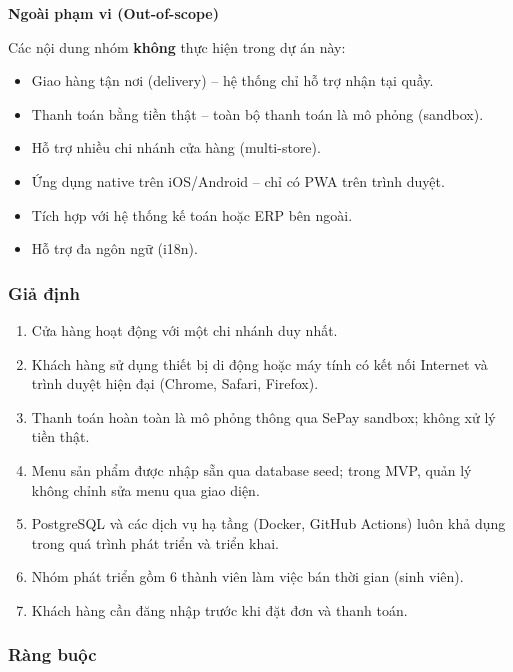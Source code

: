 \documentclass[a4paper]{article}
\begin{document}
\noindent\textbf{Ngoài phạm vi (Out-of-scope)}

Các nội dung nhóm \textbf{không} thực hiện trong dự án này:

\begin{itemize}
    \item Giao hàng tận nơi (delivery) -- hệ thống chỉ hỗ trợ nhận tại quầy.
    \item Thanh toán bằng tiền thật -- toàn bộ thanh toán là mô phỏng (sandbox).
    \item Hỗ trợ nhiều chi nhánh cửa hàng (multi-store).
    \item Ứng dụng native trên iOS/Android -- chỉ có PWA trên trình duyệt.
    \item Tích hợp với hệ thống kế toán hoặc ERP bên ngoài.
    \item Hỗ trợ đa ngôn ngữ (i18n).
\end{itemize}

\subsubsection{Giả định}

\begin{enumerate}
    \item Cửa hàng hoạt động với một chi nhánh duy nhất.
    \item Khách hàng sử dụng thiết bị di động hoặc máy tính có kết nối Internet và trình duyệt hiện đại (Chrome, Safari, Firefox).
    \item Thanh toán hoàn toàn là mô phỏng thông qua SePay sandbox; không xử lý tiền thật.
    \item Menu sản phẩm được nhập sẵn qua database seed; trong MVP, quản lý không chỉnh sửa menu qua giao diện.
    \item PostgreSQL và các dịch vụ hạ tầng (Docker, GitHub Actions) luôn khả dụng trong quá trình phát triển và triển khai.
    \item Nhóm phát triển gồm 6 thành viên làm việc bán thời gian (sinh viên).
    \item Khách hàng cần đăng nhập trước khi đặt đơn và thanh toán.
\end{enumerate}

\subsubsection{Ràng buộc}
\end{document}
